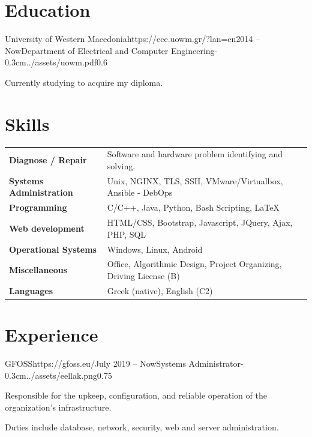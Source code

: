 \documentclass{mycv}
\begin{document}
	\section{Education}
	
	\begin{EntryDatedLogo}{University of Western Macedonia}{https://ece.uowm.gr/?lan=en}{2014 -- Now}{Department of Electrical and Computer Engineering}{-0.3cm}{../assets/uowm.pdf}{0.6}
	\begin{Itemize}
		\item Currently studying to acquire my diploma.
	\end{Itemize}
	\end{EntryDatedLogo}

	\section{Skills}
	\begin{tabular}{m{4.5cm} m{13cm}}
		\textbf{Diagnose / Repair}     	& Software and hardware problem identifying and solving. \\
		\textbf{Systems Administration}	& Unix, NGINX, TLS, SSH,  VMware/Virtualbox, Ansible - DebOps \\
		\textbf{Programming} 	 	   	& C/C++, Java, Python, Bash Scripting, \LaTeX \\
		\textbf{Web development}	   	& HTML/CSS, Bootstrap, Javascript, JQuery, Ajax, PHP, SQL \\
		\textbf{Operational Systems}   	& Windows, Linux, Android \\
		\textbf{Miscellaneous}         	& Office, Algorithmic Design, Project Organizing, Driving License (B) \\
		\textbf{Languages} 			   	& Greek (native), English (C2) 
	\end{tabular}

	\section{Experience}
	
	\begin{EntryDatedLogo}{GFOSS}{https://gfoss.eu/}{July 2019 -- Now}{Systems Administrator}{-0.3cm}{../assets/eellak.png}{0.75}
		\begin{Itemize}
			\item Responsible for the upkeep, configuration, and reliable operation of the organization's infrastructure. \item Duties include database, network, security, web and server administration.
		\end{Itemize}
	\end{EntryDatedLogo}
\end{document}
